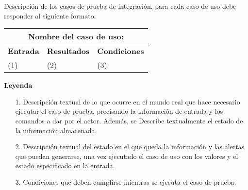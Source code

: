 \begin{enumerate}
  Descripción de los casos de prueba de integración, para cada caso de uso debe responder al siguiente formato:
  {%
  \newcommand{\mc}[3]{\multicolumn{#1}{#2}{#3}}
    \begin{longtable}{|l|l|l|}
    \mc{3}{c}{\textbf{Nombre del caso de uso:}}\\
    \hline
    \textbf{Entrada} & \textbf{Resultados} & \textbf{Condiciones}\\
    \hline
    (1) & (2) & (3)\\
    \hline
  \end{longtable}
   {\bf Leyenda}
    \begin{enumerate}
     \item[1.] Descripción textual de lo que ocurre en el mundo real que hace necesario ejecutar el caso de prueba, precisando la información de entrada y los comandos a dar por el actor. Además, se Describe textualmente el estado de la información almacenada.
     \item[2.] Descripción textual del estado en el que queda la información y las alertas que puedan generarse, una vez ejecutado el caso de uso con los valores y el estado especificado en la entrada.
     \item[3.] Condiciones que deben cumplirse mientras se ejecuta el caso de prueba.
    \end{enumerate}

}%

\end{enumerate}

